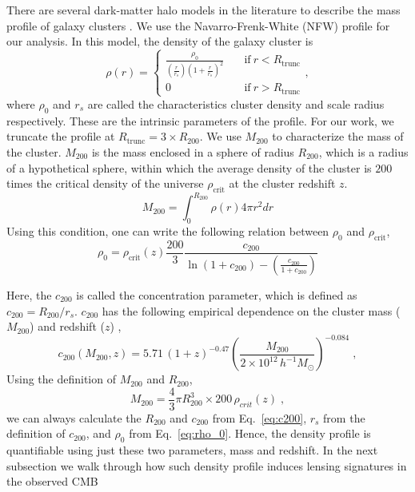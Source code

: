 \documentclass[prd, superscriptaddress, tightenlines, longbibliography, nofootinbib, eqsecnum, amsfonts, amsmath, floatfix, twocolumn, notitlepage]{revtex4-2}
\begin{document}
There are several dark-matter halo models in the literature to describe the mass profile of galaxy clusters \cite{}. We use the Navarro-Frenk-White (NFW) profile \cite{Navarro:1995iw} for our analysis. In this model, the density of the galaxy cluster is
\begin{equation}\label{eq:NFW}
    \rho(r) = \begin{cases} \displaystyle 
               \frac{\rho_0}{(\frac{r}{r_s})(1+\frac{r}{r_s})^2} &\quad \text{if} \ r < R_{\text{trunc}} \\
               0  &\quad \text{if} \ r > R_{\text{trunc}}
               \end{cases},
\end{equation}
where $\rho_0$ and $r_s$ are called the characteristics cluster density and scale radius respectively. These are the intrinsic parameters of the profile. For our work, we truncate the profile at $R_{\text{trunc}} = 3\times R_{200}$. We use $M_{200}$ to characterize the mass of the cluster. $M_{200}$ is the mass enclosed in a sphere of radius $R_{200}$, which is a radius of a hypothetical sphere, within which the average density of the cluster is $200$ times the critical density of the universe $\rho_{\text{crit}}$ at the cluster redshift $z$.
\begin{equation}
    M_{200} = \int_0^{R_{200}}\rho(r) 4\pi r^2 dr 
\end{equation}
Using this condition, one can write the following relation between $\rho_0$ and $\rho_{\text{crit}}$,
\begin{equation}\label{eq:rho_0}
    \rho_0 = \rho_{\text{crit}}(z)   \frac{200}{3}   \frac{c_{200}}{ \displaystyle \ln{(1+c_{200})}-\left(\frac{c_{200}}{1+c_{200}}\right)}
\end{equation}

Here, the $c_{200}$ is called the concentration parameter, which is defined as $c_{200} = R_{200}/r_s$. $c_{200}$ has the following empirical dependence on the cluster mass ($M_{200}$) and redshift ($z$) \cite{Geach:2017crt, Duffy:2008pz},
\begin{equation}\label{eq:c200}
    c_{200}(M_{200}, z) = 5.71 \, (1+z)^{-0.47} \left(\frac{M_{200}}{2\times10^{12} \, h^{-1}M_{\odot}}\right)^{-0.084} \; ,
\end{equation}
Using the definition of $M_{200}$ and $R_{200}$,
\begin{equation}\label{eq:R_200}
    M_{200} = \frac{4}{3}\pi R_{200}^3 \times 200 \, \rho_{crit}(z) \; ,
\end{equation}
we can always calculate the $R_{200}$ and $c_{200}$ from Eq.~\eqref{eq:c200}, $r_{s}$ from the definition of $c_{200}$, and $\rho_0$ from Eq.~\eqref{eq:rho_0}. Hence, the density profile is quantifiable using just these two parameters, mass and redshift. In the next subsection we walk through how such density profile induces lensing signatures in the observed CMB
\end{document}
